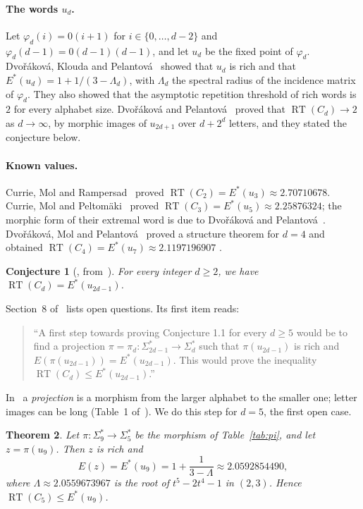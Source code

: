 \documentclass[11pt]{article}
\newtheorem{theorem}{Theorem}
\newtheorem{conjecture}[theorem]{Conjecture}
\theoremstyle{remark}
\newcommand{\RT}{\operatorname{RT}}
\begin{document}
\paragraph{The words $u_d$.} Let $\varphi_d(i)=0(i+1)$ for $i\in\{0,\dots,d-2\}$ and
$\varphi_d(d-1)=0(d-1)(d-1)$, and let $u_d$ be the fixed point of $\varphi_d$. Dvořáková,
Klouda and Pelantová~\cite{dkp} showed that $u_d$ is rich and that
$E^*(u_d)=1+1/(3-\Lambda_d)$, with $\Lambda_d$ the spectral radius of the incidence matrix
of $\varphi_d$. They also showed that the asymptotic repetition threshold of rich words is
$2$ for every alphabet size. Dvořáková and Pelantová~\cite{dp-limit} proved that
$\RT(C_d)\to2$ as $d\to\infty$, by morphic images of $u_{2d+1}$ over $d+2^d$ letters, and
they stated the conjecture below.

\paragraph{Known values.} Currie, Mol and Rampersad~\cite{cmr} proved
$\RT(C_2)=E^*(u_3)\approx2.70710678$. Currie, Mol and Peltomäki~\cite{cmp} proved
$\RT(C_3)=E^*(u_5)\approx2.25876324$; the morphic form of their extremal word is due to
Dvořáková and Pelantová~\cite{dp-sym}. Dvořáková, Mol and Pelantová~\cite{dmp} proved a
structure theorem for $d=4$ and obtained $\RT(C_4)=E^*(u_7)\approx2.1197196907$
\cite[Corollary~1.6]{dmp}.

\begin{conjecture}[{\cite[Conjecture~1.1]{dmp}, from~\cite{dp-limit}}]\label{conj}
For every integer $d\ge2$, we have $\RT(C_d)=E^*(u_{2d-1})$.
\end{conjecture}

Section~8 of~\cite{dmp} lists open questions. Its first item reads:
\begin{quote}
``A first step towards proving Conjecture 1.1 for every $d\ge5$ would be to find a
projection $\pi=\pi_d:\Sigma^*_{2d-1}\to\Sigma^*_d$ such that $\pi(u_{2d-1})$ is rich and
$E(\pi(u_{2d-1}))=E^*(u_{2d-1})$. This would prove the inequality
$\RT(C_d)\le E^*(u_{2d-1})$.''
\end{quote}
In~\cite{dmp} a \emph{projection} is a morphism from the larger alphabet to the smaller
one; letter images can be long (Table~1 of~\cite{dmp}). We do this step for $d=5$, the
first open case.

\begin{theorem}\label{thm:main}
Let $\pi\colon\Sigma_9^*\to\Sigma_5^*$ be the morphism of Table~\ref{tab:pi}, and let
$z=\pi(u_9)$. Then $z$ is rich and
\[
E(z)=E^*(u_9)=1+\frac1{3-\Lambda}\approx 2.0592854490,
\]
where $\Lambda\approx2.0559673967$ is the root of $t^5-2t^4-1$ in $(2,3)$. Hence
$\RT(C_5)\le E^*(u_9)$.
\end{theorem}
\end{document}
